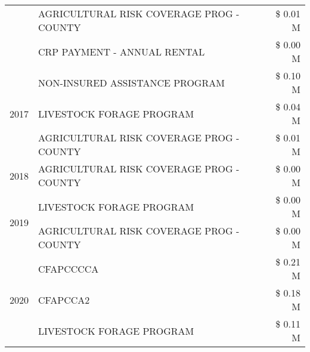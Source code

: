 \begin{tabular}{llr}
 & AGRICULTURAL RISK COVERAGE PROG - COUNTY      & \$ 0.01 M \\
 & CRP PAYMENT - ANNUAL RENTAL                   & \$ 0.00 M \\
\cline{1-3}
\multirow[t]{3}{*}{2017} & NON-INSURED ASSISTANCE PROGRAM & \$ 0.10 M \\
 & LIVESTOCK FORAGE PROGRAM & \$ 0.04 M \\
 & AGRICULTURAL RISK COVERAGE PROG - COUNTY & \$ 0.01 M \\
\cline{1-3}
2018 & AGRICULTURAL RISK COVERAGE PROG - COUNTY & \$ 0.00 M \\
\cline{1-3}
\multirow[t]{2}{*}{2019} & LIVESTOCK FORAGE PROGRAM & \$ 0.00 M \\
 & AGRICULTURAL RISK COVERAGE PROG - COUNTY & \$ 0.00 M \\
\cline{1-3}
\multirow[t]{3}{*}{2020} & CFAPCCCCA & \$ 0.21 M \\
 & CFAPCCA2 & \$ 0.18 M \\
 & LIVESTOCK FORAGE PROGRAM & \$ 0.11 M \\
\cline{1-3}
\bottomrule
\end{tabular}
